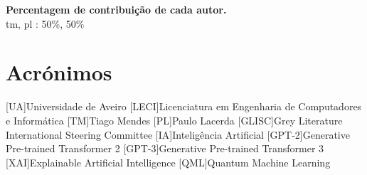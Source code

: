 \documentclass[a4paper, 11pt, onecolumn, oneside]{report}
\begin{document}
\vspace{10pt}
\textbf{Percentagem de contribuição de cada autor.}\\

\ac{tm}, \ac{pl} : 50\%, 50\%\\

\chapter*{Acrónimos}
%
\begin{acronym}
[UA]{Universidade de Aveiro}
[LECI]{Licenciatura em Engenharia de Computadores e Informática}
[TM]{Tiago Mendes}
[PL]{Paulo Lacerda}
[GLISC]{Grey Literature International Steering Committee}
[IA]{Inteligência Artificial}
[GPT-2]{Generative Pre-trained Transformer 2}
[GPT-3]{Generative Pre-trained Transformer 3}
[XAI]{Explainable Artificial Intelligence}
[QML]{Quantum Machine Learning}
\end{acronym}


\printbibliography
\end{document}
